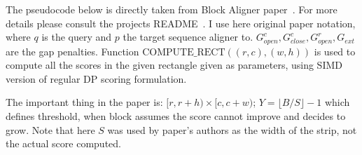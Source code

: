 The pseudocode below is directly taken from Block Aligner paper~\cite{block_aligner_paper}. For more details please consult the projects README~\cite{block_aligner_readme}.
I use here original paper notation, where \(q\) is the query and \(p\) the
target sequence aligner to.
\(G^c_{open},G^c_{close},G^r_{open},G_{ext}\) are the gap penalties.
Function \(\mathrm{COMPUTE\_RECT}((r,c),(w,h))\) is used to compute all the scores in the given rectangle given as parameters, using SIMD version of regular DP scoring formulation.

The important thing in the paper is: \([r,r+h)\times[c,c+w)\); \(Y=\lfloor B/S\rfloor-1\) which defines threshold, when block assumes the score cannot improve and decides to grow.
Note that here $S$ was used by paper's authors as the width of the strip, not the actual score computed. 

